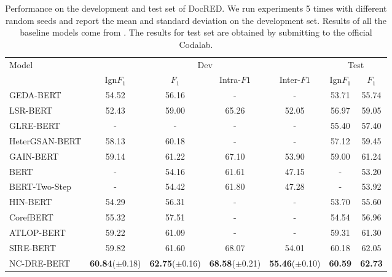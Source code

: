 \documentclass[sigconf,natbib=true]{acmart}
\begin{document}
\begin{table*}[th]
\centering
\begin{tabular}{lcccccc}
\toprule
Model               & \multicolumn{4}{c}{Dev}                  & \multicolumn{2}{c}{Test} \\
                     & Ign$F_1$         & $F_1$     & Intra-$F1$    & Inter-$F1$   & Ign$F_1$     & $F_1$  \\ [2pt]\toprule
GEDA-BERT \cite{c:129}       & 54.52    & 56.16     & -             & -       & 53.71      & 55.74       \\
LSR-BERT \cite{c:130}        & 52.43    & 59.00        &65.26          &52.05    & 56.97      & 59.05       \\
GLRE-BERT \cite{c:131}       & -        & -         & -             & -       & 55.40       & 57.40        \\
HeterGSAN-BERT \cite{c:133}  & 58.13    & 60.18     & -             & -        & 57.12      & 59.45       \\ 
GAIN-BERT \cite{c:118}       & 59.14    & 61.22     &67.10          &53.90     & 59.00         & 61.24       \\ [2pt] \toprule
BERT \cite{c:134}            & -        & 54.16     &61.61          &47.15      & -          & 53.20        \\
BERT-Two-Step \cite{c:134}   & -        & 54.42     &61.80          &47.28     & -          & 53.92       \\
HIN-BERT\cite{c:111}         & 54.29       & 56.31     & -             & -         & 53.70       & 55.60        \\
CorefBERT\cite{c:145}        & 55.32       & 57.51     & -             & -         & 54.54      & 56.96       \\
ATLOP-BERT\cite{c:106}       & 59.22       & 61.09     & -             & -         & 59.31      & 61.30       \\ 
SIRE-BERT\cite{c:121}        & 59.82     & 61.60     & 68.07         & 54.01     & 60.18     & 62.05 \\  [2pt] \toprule
      
NC-DRE-BERT         & \textbf{60.84}($\pm$0.18) & \textbf{62.75}($\pm$0.16) & \textbf{68.58}($\pm$0.21) & \textbf{55.46}($\pm$0.10) & \textbf{60.59} & \textbf{62.73} \\ \bottomrule

\end{tabular}
\caption{\label{tab1} 
Performance on the development and test set of DocRED. 
We run experiments 5 times with different random seeds and report the
mean and standard deviation on the development set.
Results of all the baseline models come from \cite{c:106,c:121}. 
The results for test set are obtained by submitting to the official Codalab.
}
\end{table*}
\end{document}
